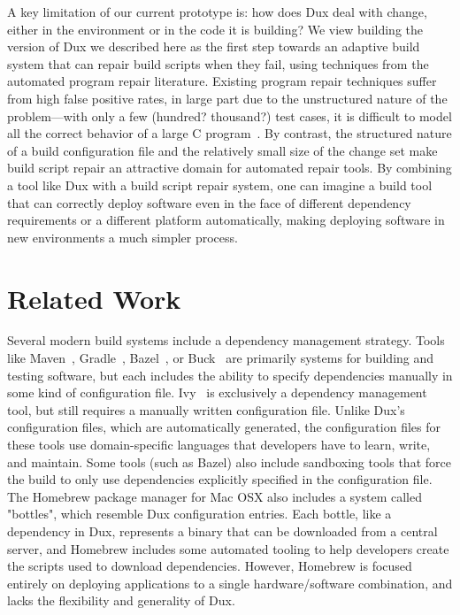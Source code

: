 \documentclass[10pt,conference]{IEEEtran}
\begin{document}
A key limitation of our current prototype is: how does Dux deal with
change, either in the environment or in the code it is building? We view building
the version of Dux we described here as the first step towards an adaptive
build system that can repair build scripts when they fail, using techniques
from the automated program repair literature. Existing program repair techniques
suffer from high false positive rates, in large part due to the unstructured
nature of the problem---with only a few (hundred? thousand?) test cases, it is
difficult to model all the correct behavior of a large C program~\cite{genprogisbadrinard}.
By contrast, the structured nature of a build configuration file and the relatively
small size of the change set make build script repair an attractive domain for
automated repair tools. By combining a tool like Dux with a build script repair
system, one can imagine a build tool that can correctly deploy software even in
the face of different dependency requirements or a different platform automatically,
making deploying software in new environments a much simpler process.

\section{Related Work}

Several modern build systems include a dependency management strategy. Tools like
Maven~\cite{Maven}, Gradle~\cite{Gradle}, Bazel~\cite{blaze}, or Buck~\cite{buck}
are primarily systems for building and testing software, but each includes the
ability to specify dependencies manually in some kind of configuration file.
Ivy~\cite{Ivy} is exclusively a dependency management tool, but still requires
a manually written configuration file.
Unlike Dux's configuration files, which are automatically generated, the configuration
files for these tools use domain-specific languages that developers have to learn,
write, and maintain. Some tools (such as Bazel) also include sandboxing tools
that force the build to only use dependencies explicitly specified in the
configuration file. The Homebrew package manager for Mac OSX also includes
a system called "bottles", which resemble Dux configuration entries\cite{homebrew}.
Each bottle, like a dependency in Dux, represents a binary that can be downloaded
from a central server, and Homebrew includes some automated tooling to help
developers create the scripts used to download dependencies. However,
Homebrew is focused entirely on deploying applications to a single hardware/software
combination, and lacks the flexibility and generality of Dux.
\end{document}
